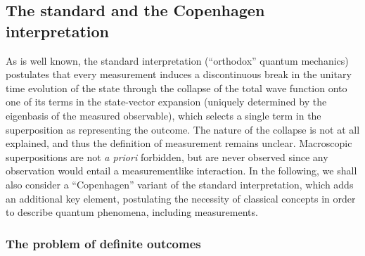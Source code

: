 \documentclass[rmp,aps,amsmath,amsfonts,noshowkeys,noshowpacs,12pt]{revtex4}
\begin{document}
\subsection{The standard and the Copenhagen interpretation}

As is well known, the standard interpretation (``orthodox'' quantum
mechanics) postulates that every measurement induces a discontinuous
break in the unitary time evolution of the state through the collapse
of the total wave function onto one of its terms in the state-vector
expansion (uniquely determined by the eigenbasis of the measured
observable), which selects a single term in the superposition as
representing the outcome. The nature of the collapse is not at all
explained, and thus the definition of measurement remains unclear.
Macroscopic superpositions are not \emph{a priori} forbidden, but are
never observed since any observation would entail a measurementlike
interaction. In the following, we shall also consider a ``Copenhagen''
variant of the standard interpretation, which adds an additional key
element, postulating the necessity of classical concepts in order to
describe quantum phenomena, including measurements.


\subsubsection{The problem of definite outcomes}
\end{document}
